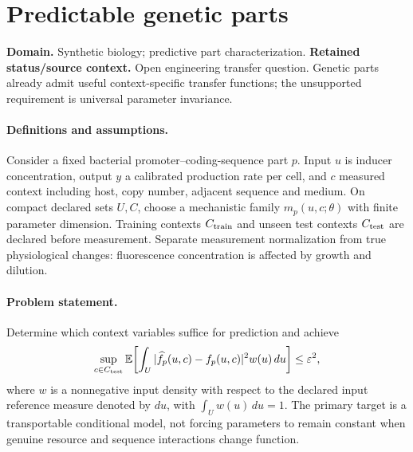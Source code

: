 \documentclass[11pt]{article}
\begin{document}
\section*{Predictable genetic parts}
\label{prob:261}
\label{rank:182}
\par\smallskip

\noindent\textbf{Domain.} Synthetic biology; predictive part characterization. \quad \textbf{Retained status/source context.} Open engineering transfer question. Genetic parts already admit useful context-specific transfer functions; the unsupported requirement is universal parameter invariance.

\paragraph{Definitions and assumptions.} Consider a fixed bacterial promoter--coding-sequence part $p$. Input $u$ is inducer concentration, output $y$ a calibrated production rate per cell, and $c$ measured context including host, copy number, adjacent sequence and medium. On compact declared sets $U,C$, choose a mechanistic family $m_p(u,c;\theta)$ with finite parameter dimension. Training contexts $C_{\rm train}$ and unseen test contexts $C_{\rm test}$ are declared before measurement. Separate measurement normalization from true physiological changes: fluorescence concentration is affected by growth and dilution.

\paragraph{Problem statement.} Determine which context variables suffice for prediction and achieve
\[
\sup_{c\in C_{\rm test}}\mathbb{E}\!\left[\int_U
|\widehat f_p(u,c)-f_p(u,c)|^2w(u)\,du\right]\leq\varepsilon^2,
\]
where $w$ is a nonnegative input density with respect to the declared input reference measure denoted by $du$, with $\int_U w(u)\,du=1$. The primary target is a transportable conditional model, not forcing parameters to remain constant when genuine resource and sequence interactions change function.
\end{document}
